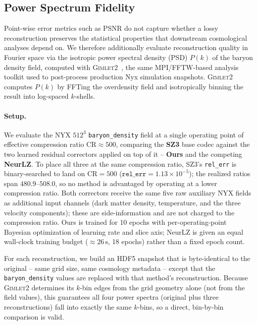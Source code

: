 \subsection{Power Spectrum Fidelity}
\label{sec:eval-psd}

Point-wise error metrics such as PSNR do not capture whether a lossy
reconstruction preserves the statistical properties that downstream
cosmological analyses depend on. We therefore additionally evaluate
reconstruction quality in Fourier space via the isotropic power spectral
density (PSD) $P(k)$ of the baryon density field, computed with
\textsc{Gimlet2}~\cite{gimlet2}, the same MPI/FFTW-based analysis toolkit
used to post-process production Nyx simulation snapshots. \textsc{Gimlet2}
computes $P(k)$ by FFTing the overdensity field and isotropically binning
the result into log-spaced $k$-shells.

\paragraph{Setup.} We evaluate the NYX $512^3$ \texttt{baryon\_density}
field at a single operating point of effective compression ratio
$\mathrm{CR}\approx500$, comparing the \textbf{SZ3} base codec against
the two learned residual correctors applied on top of it --
\textbf{Ours} and the competing \textbf{NeurLZ}. To place all three at
the same compression ratio, SZ3's \texttt{rel\_err} is binary-searched to
land on $\mathrm{CR}=500$ ($\texttt{rel\_err}=1.13\times10^{-5}$); the
realized ratios span $480.9$--$508.0$, so no method is advantaged by
operating at a lower compression ratio. Both correctors receive the same
five raw auxiliary NYX fields as additional input channels (dark matter
density, temperature, and the three velocity components); these are
side-information and are not charged to the compression ratio. Ours is
trained for 10 epochs with per-operating-point Bayesian optimization of
learning rate and slice axis; NeurLZ is given an equal wall-clock
training budget ($\approx26\,\mathrm{s}$, 18 epochs) rather than a fixed
epoch count.

For each reconstruction, we build an HDF5 snapshot that is byte-identical
to the original -- same grid size, same cosmology metadata -- except that
the \texttt{baryon\_density} values are replaced with that method's
reconstruction. Because \textsc{Gimlet2} determines its $k$-bin edges
from the grid geometry alone (not from the field values), this guarantees
all four power spectra (original plus three reconstructions) fall into
exactly the same $k$-bins, so a direct, bin-by-bin comparison is valid.

